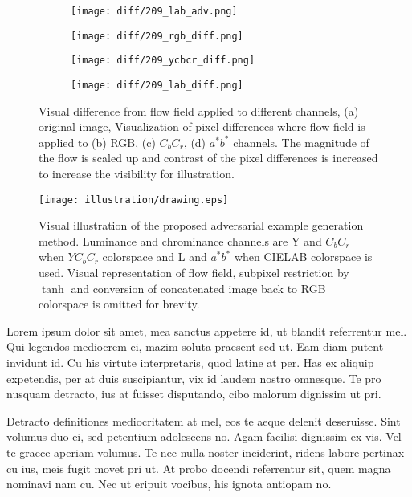 \begin{figure}[t]
    \centering
    \begin{subfigure}[b]{.23\linewidth}
        \texttt{[image: diff/209\_lab\_adv.png]}
        \caption{}
    \end{subfigure}
    \begin{subfigure}[b]{.23\linewidth}
        \texttt{[image: diff/209\_rgb\_diff.png]}
        \caption{}
    \end{subfigure}
    \begin{subfigure}[b]{.23\linewidth}
        \texttt{[image: diff/209\_ycbcr\_diff.png]}
        \caption{}
    \end{subfigure}
    \begin{subfigure}[b]{.23\linewidth}
        \texttt{[image: diff/209\_lab\_diff.png]}
        \caption{}
    \end{subfigure}
    \caption{Visual difference from flow field applied to different channels, (a) original image, Visualization of pixel differences where flow field is applied to (b) RGB, (c) \(C_{b}C_{r}\), (d) \(a^*b^*\) channels. The magnitude of the flow is scaled up and contrast of the pixel differences is increased to increase the visibility for illustration. }\label{fig:diff}
\end{figure}

\begin{figure*}[t]
    \centering
    \texttt{[image: illustration/drawing.eps]}
    \caption{Visual illustration of the proposed adversarial example generation method. Luminance and chrominance channels are Y and \(C_{b}C_{r}\) when \(YC_{b}C_{r}\) colorspace and L and \(a^*b^*\) when CIELAB colorspace is used. Visual representation of flow field, subpixel restriction by \(\tanh\) and conversion of concatenated image back to RGB colorspace is omitted for brevity.}\label{fig:algorithm}
\end{figure*}
Lorem ipsum dolor sit amet, mea sanctus appetere id, ut blandit referrentur mel. Qui legendos mediocrem ei, mazim soluta praesent sed ut. Eam diam putent invidunt id. Cu his virtute interpretaris, quod latine at per. Has ex aliquip expetendis, per at duis suscipiantur, vix id laudem nostro omnesque. Te pro nusquam detracto, ius at fuisset disputando, cibo malorum dignissim ut pri.

Detracto definitiones mediocritatem at mel, eos te aeque delenit deseruisse. Sint volumus duo ei, sed petentium adolescens no. Agam facilisi dignissim ex vis. Vel te graece aperiam volumus. Te nec nulla noster inciderint, ridens labore pertinax cu ius, meis fugit movet pri ut. At probo docendi referrentur sit, quem magna nominavi nam cu. Nec ut eripuit vocibus, his ignota antiopam no.

